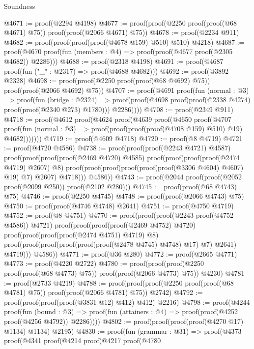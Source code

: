 \begin{lexlean}{Soundness}
\begin{coremodule}
@4671 := proof(@2294 @4198)
@4677 := proof(proof(@2250 proof(proof(@68 @4671) @75)) proof(proof(@2066 @4671) @75))
@4678 := proof(@2234 @911)
@4682 := proof(proof(proof(proof(@4678 @159) @510) @510) @4218)
@4687 := proof(@4670 proof(fun (members : @4) => proof(proof(@4677 proof(@2305 @4682)) @2286)))
@4688 := proof(@2318 @4198)
@4691 := proof(@4687 proof(fun ("_" : @2317) => proof(@4688 @4682)))
@4692 := proof(@3892 @2328)
@4698 := proof(proof(@2250 proof(proof(@68 @4692) @75)) proof(proof(@2066 @4692) @75))
@4707 := proof(@4691
      proof(fun (normal : @3) =>
        proof(fun (bridge : @2324) =>
          proof(proof(@4698 proof(proof(@2338 @4274) proof(proof(@2340 @273) @1780))) @2286))))
@4708 := proof(@2349 @911)
@4718 := proof(@4612
      proof(@4624
          proof(@4639
              proof(@4650
                  proof(@4707
                      proof(fun (normal : @3) =>
                        proof(proof(proof(proof(@4708 @159) @510) @19) @4682)))))))
@4719 := proof(@4609 @4718)
@4720 := proof(@8 @4719)
@4721 := proof(@4720 @4586)
@4738 := proof(proof(proof(@2243 @4721) @4587)
      proof(proof(proof(proof(@2469 @4720) @4585)
            proof(proof(proof(proof(@2474 @4719) @2607) @8)
                proof(proof(proof(proof(proof(proof(@3306 @4604) @4607) @19) @7) @2607) @4718)))
          @4586))
@4743 := proof(@2044 proof(proof(@2052 proof(@2099 @250)) proof(@2102 @280)))
@4745 := proof(proof(@68 @4743) @75)
@4746 := proof(@2250 @4745)
@4748 := proof(proof(@2066 @4743) @75)
@4750 := proof(proof(@4746 @4748) @2641)
@4751 := proof(@4750 @4719)
@4752 := proof(@8 @4751)
@4770 := proof(proof(proof(@2243 proof(@4752 @4586)) @4721)
      proof(proof(proof(proof(@2469 @4752) @4720)
            proof(proof(proof(proof(@2474 @4751) @4719) @8)
                proof(proof(proof(proof(proof(proof(@2478 @4745) @4748) @17) @7) @2641) @4719)))
          @4586))
@4771 := proof(@36 @280)
@4772 := proof(@2665 @4771)
@4773 := proof(@4220 @2722)
@4780 := proof(proof(proof(@2250 proof(proof(@68 @4773) @75)) proof(proof(@2066 @4773) @75)) @4230)
@4781 := proof(@2733 @4219)
@4788 := proof(proof(proof(@2250 proof(proof(@68 @4781) @75)) proof(proof(@2066 @4781) @75)) @2742)
@4792 := proof(proof(proof(proof(@3831 @12) @412) @412) @2216)
@4798 := proof(@4244
      proof(fun (bound : @3) =>
        proof(fun (attainers : @4) => proof(proof(@4252 proof(@4256 @4792)) @2286))))
@4802 := proof(proof(proof(proof(@4270 @17) @1134) @1134) @2195)
@4830 := proof(fun (grammar : @31) =>
    proof(@4373
        proof(@4341
            proof(@4214
                proof(@4217
                    proof(@4780

\end{coremodule}
\end{lexlean}
